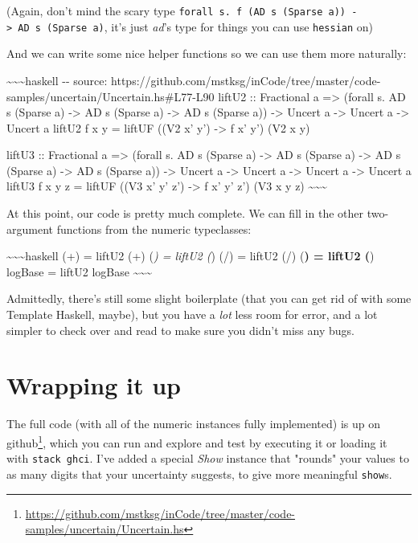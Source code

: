 \documentclass[]{article}
\renewcommand{\href}[2]{#2\footnote{\url{#1}}}
\begin{document}
(Again, don't mind the scary type
\texttt{forall\ s.\ f\ (AD\ s\ (Sparse\ a))\ -\textgreater{}\ AD\ s\ (Sparse\ a)},
it's just \emph{ad}'s type for things you can use
\texttt{hessian\textquotesingle{}} on)

And we can write some nice helper functions so we can use them more naturally:

\textasciitilde{}\textasciitilde{}\textasciitilde{}haskell -\/- source:
https://github.com/mstksg/inCode/tree/master/code-samples/uncertain/Uncertain.hs\#L77-L90
liftU2 :: Fractional a =\textgreater{} (forall s. AD s (Sparse a)
-\textgreater{} AD s (Sparse a) -\textgreater{} AD s (Sparse a)) -\textgreater{}
Uncert a -\textgreater{} Uncert a -\textgreater{} Uncert a liftU2 f x y = liftUF
((V2 x' y') -\textgreater{} f x' y') (V2 x y)

liftU3 :: Fractional a =\textgreater{} (forall s. AD s (Sparse a)
-\textgreater{} AD s (Sparse a) -\textgreater{} AD s (Sparse a) -\textgreater{}
AD s (Sparse a)) -\textgreater{} Uncert a -\textgreater{} Uncert a
-\textgreater{} Uncert a -\textgreater{} Uncert a liftU3 f x y z = liftUF ((V3
x' y' z') -\textgreater{} f x' y' z') (V3 x y z)
\textasciitilde{}\textasciitilde{}\textasciitilde{}

At this point, our code is pretty much complete. We can fill in the other
two-argument functions from the numeric typeclasses:

\textasciitilde{}\textasciitilde{}\textasciitilde{}haskell (+) = liftU2 (+)
(\emph{) = liftU2 (}) (/) = liftU2 (/) (\textbf{) = liftU2 (}) logBase = liftU2
logBase \textasciitilde{}\textasciitilde{}\textasciitilde{}

Admittedly, there's still some slight boilerplate (that you can get rid of with
some Template Haskell, maybe), but you have a \emph{lot} less room for error,
and a lot simpler to check over and read to make sure you didn't miss any bugs.

\section{Wrapping it up}

The full code (with all of the numeric instances fully implemented) is up
\href{https://github.com/mstksg/inCode/tree/master/code-samples/uncertain/Uncertain.hs}{on
github}, which you can run and explore and test by executing it or loading it
with \texttt{stack\ ghci}. I've added a special \emph{Show} instance that
"rounds" your values to as many digits that your uncertainty suggests, to give
more meaningful \texttt{show}s.
\end{document}
